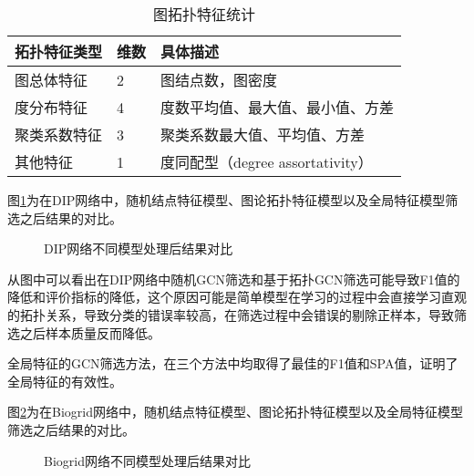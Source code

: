 \begin{table}[h]
    \centering
    \caption{图拓扑特征统计}
    \label{tab:datasets:statisticgraphfeat}
    \begin{tabular}{C{3cm}C{2cm}L{8cm}}
        \toprule
        \textbf{拓扑特征类型} & \textbf{维数} & \textbf{具体描述}                \\
        \midrule
        图总体特征            & 2             & 图结点数，图密度                 \\
        度分布特征            & 4             & 度数平均值、最大值、最小值、方差 \\
        聚类系数特征          & 3             & 聚类系数最大值、平均值、方差     \\
        其他特征              & 1             & 度同配型（degree assortativity） \\
        \bottomrule
    \end{tabular}
\end{table}

图\ref{fig:result/DIP/node}为在DIP网络中，随机结点特征模型、图论拓扑特征模型以及全局特征模型筛选之后结果的对比。
\begin{figure}[htbp]
    \centering
    \vskip0.2cm
    \caption{DIP网络不同模型处理后结果对比}
    \label{fig:result/DIP/node}
\end{figure}

从图中可以看出在DIP网络中随机GCN筛选和基于拓扑GCN筛选可能导致F1值的降低和评价指标的降低，这个原因可能是简单模型在学习的过程中会直接学习直观的拓扑关系，导致分类的错误率较高，在筛选过程中会错误的剔除正样本，导致筛选之后样本质量反而降低。

全局特征的GCN筛选方法，在三个方法中均取得了最佳的F1值和SPA值，证明了全局特征的有效性。

图\ref{fig:result/Biogrid/node}为在Biogrid网络中，随机结点特征模型、图论拓扑特征模型以及全局特征模型筛选之后结果的对比。
\begin{figure}[htbp]
    \centering
    \vskip0.2cm
    \caption{Biogrid网络不同模型处理后结果对比}
    \label{fig:result/Biogrid/node}
\end{figure}

